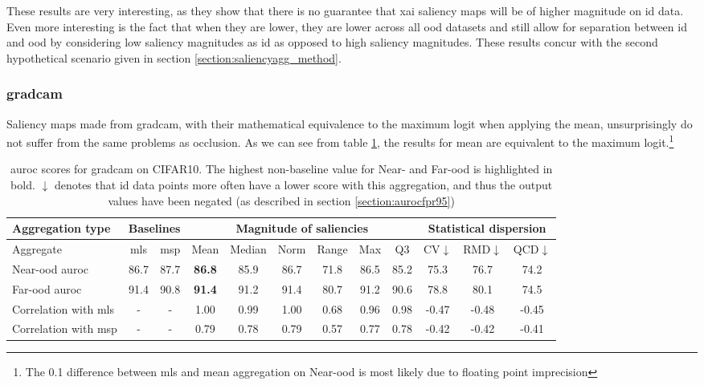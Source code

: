 \documentclass[UKenglish]{uiomasterthesis} %
\theoremstyle{definition}
\begin{document}
These results are very interesting, as they show that there is no guarantee that \ac{xai} saliency maps will be of higher magnitude on \ac{id} data. Even more interesting is the fact that when they are lower, they are lower across all \ac{ood} datasets and still allow for separation between \ac{id} and \ac{ood} by considering low saliency magnitudes as \ac{id} as opposed to high saliency magnitudes. These results concur with the second hypothetical scenario given in section \ref{section:saliencyagg_method}.

\subsubsection{\ac{gradcam}}

Saliency maps made from \ac{gradcam}, with their mathematical equivalence to the maximum logit when applying the mean, unsurprisingly do not suffer from the same problems as occlusion. As we can see from table \ref{table:cifar10_gradcam_metrics}, the results for mean are equivalent to the maximum logit.\footnote{The 0.1 difference between \ac{mls} and mean aggregation on Near-\ac{ood} is most likely due to floating point imprecision}

\begin{table}[hbtp]
\setlength\tabcolsep{3pt}
\begin{center}
\begin{tabular}{ |p{5.1em}|c c|c c c c c c|c c c| }
    \hline
     \centering Aggregation type & \multicolumn{2}{c|}{Baselines} & \multicolumn{6}{c|}{Magnitude of saliencies} & \multicolumn{3}{p{8em}|}{\centering Statistical dispersion} \\
    \hline
    Aggregate & \ac{mls} & \ac{msp} & Mean & Median & Norm & Range & Max & Q3 & CV$\downarrow$ & RMD$\downarrow$ & QCD$\downarrow$  \\
    \hline
    \rowcolor{near!50}
    Near-\ac{ood} \ac{auroc} & 86.7 & 87.7 &\textbf{ 86.8 }& 85.9 & 86.7 & 71.8 & 86.5 & 85.2 & 75.3 & 76.7 & 74.2  \\
    \hline
    \rowcolor{far!50}
    Far-\ac{ood} \ac{auroc} & 91.4 & 90.8 &\textbf{ 91.4 }& 91.2 & 91.4 & 80.7 & 91.2 & 90.6 & 78.8 & 80.1 & 74.5  \\
    \hline
    Correlation with \ac{mls}& - & - & 1.00 & 0.99 & 1.00 & 0.68 & 0.96 & 0.98 & -0.47 & -0.48 & -0.45  \\
    \hline
    Correlation with \ac{msp}& - & - & 0.79 & 0.78 & 0.79 & 0.57 & 0.77 & 0.78 & -0.42 & -0.42 & -0.41  \\
    \hline
    \end{tabular}
    \caption[\ac{auroc} scores for \ac{gradcam} on CIFAR10]{\ac{auroc} scores for \ac{gradcam} on CIFAR10. The highest non-baseline value for Near- and Far-\ac{ood} is highlighted in bold. $\downarrow$ denotes that \ac{id} data points more often have a lower score with this aggregation, and thus the output values have been negated (as described in section \ref{section:aurocfpr95})}
    \label{table:cifar10_gradcam_metrics}
\end{center}
\setlength\tabcolsep{6pt}
\end{table}
\end{document}
